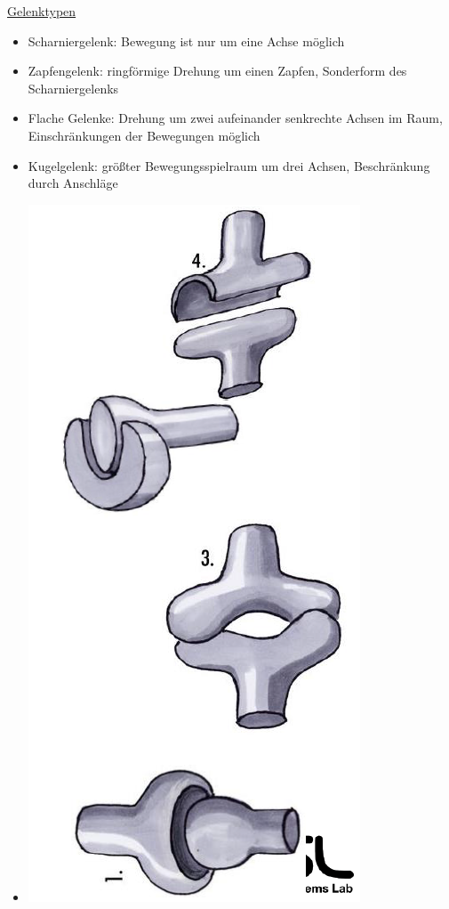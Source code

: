 \documentclass[a4paper,10pt,oneside]{article}
\begin{document}
\underline{Gelenktypen} \\
	\begin{itemize}
		\item Scharniergelenk: Bewegung ist nur um eine Achse möglich
		\item Zapfengelenk: ringförmige Drehung um einen Zapfen, Sonderform des Scharniergelenks
		\item Flache Gelenke: Drehung um zwei aufeinander senkrechte Achsen im Raum, Einschränkungen der Bewegungen möglich
		\item Kugelgelenk: größter Bewegungsspielraum um drei Achsen, Beschränkung durch Anschläge
		\item[] \includegraphics[scale=0.2]{Grafiken/2212.png}
	\end{itemize}
	
\end{document}
